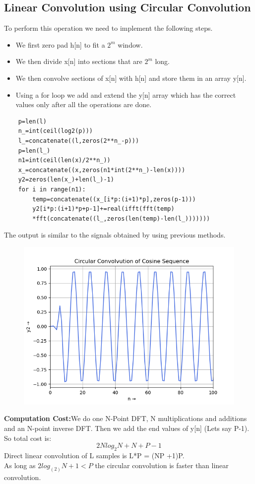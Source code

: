 \documentclass[11pt, a4paper]{article}
\begin{document}
\subsection{Linear Convolution using Circular Convolution}
To perform this operation we need to implement the following steps.
\begin{itemize}
    \item We first zero pad h[n] to fit a $2^m$ window.
    \item We then divide x[n] into sections that are $2^m$ long.
    \item We then convolve sections of x[n] with h[n] and store them in an array y[n].
    \item Using a for loop we add and extend the y[n] array which has the correct values only after all the operations are done.
\end{itemize}
\begin{verbatim}
    p=len(l)
    n_=int(ceil(log2(p)))
    l_=concatenate((l,zeros(2**n_-p)))
    p=len(l_)
    n1=int(ceil(len(x)/2**n_))
    x_=concatenate((x,zeros(n1*int(2**n_)-len(x))))
    y2=zeros(len(x_)+len(l_)-1)
    for i in range(n1):
        temp=concatenate((x_[i*p:(i+1)*p],zeros(p-1)))
        y2[i*p:(i+1)*p+p-1]+=real(ifft(fft(temp)
        *fft(concatenate((l_,zeros(len(temp)-len(l_)))))))
\end{verbatim}
The output is similar to the signals obtained by using previous methods.
\begin{figure}[H]
   	\centering
   	\includegraphics[scale=0.5]{Figure_5.png}
\end{figure}
\textbf{Computation Cost:}We do one N-Point DFT, N multiplications and additions and an N-point inverse DFT. Then we add the end values of y[n] (Lets say P-1). So total cost is:
\begin{equation}
    2Nlog_{2}N + N + P-1
\end{equation}
Direct linear convolution of L samples is L*P = (NP +1)P.\\
As long as $2log_(2)N + 1 <P$ the circular convolution is faster than linear convolution.
\end{document}
